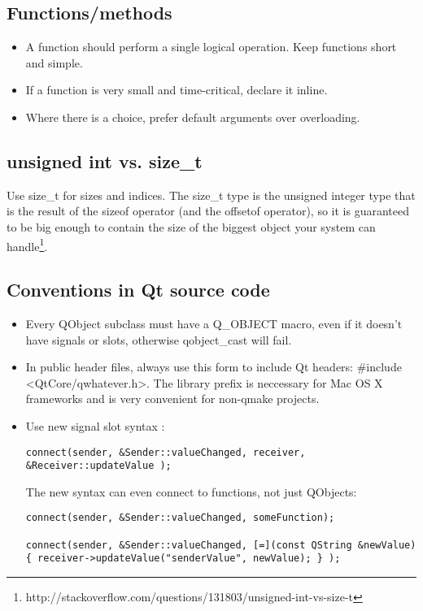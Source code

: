 \documentclass[a4paper,12pt]{article}
\begin{document}
\subsection{Functions/methods}
\begin{itemize}
\item A function should perform a single logical operation. Keep functions short and simple.
\item If a function is very small and time-critical, declare it inline.
\item  Where there is a choice, prefer default arguments over overloading.
\end{itemize}

\subsection{unsigned int vs. size\_t}
Use size\_t for sizes and indices. The size\_t type is the unsigned integer type that is the result of the sizeof operator (and the offsetof operator), so it is guaranteed to be big enough to contain the size of the biggest object your system can handle\footnote{http://stackoverflow.com/questions/131803/unsigned-int-vs-size-t}.


\subsection{Conventions in Qt source code}
\begin{itemize}
\item Every QObject subclass must have a Q\_OBJECT macro, even if it doesn't have signals or slots, otherwise qobject\_cast will fail.
\item In public header files, always use this form to include Qt headers: \#include <QtCore/qwhatever.h>. The library prefix is neccessary for Mac OS X frameworks and is very convenient for non-qmake projects.
\item Use new signal slot syntax : 
\begin{lstlisting}[breaklines]
connect(sender, &Sender::valueChanged, receiver, &Receiver::updateValue );
 \end{lstlisting}
The new syntax can even connect to functions, not just QObjects:
\begin{lstlisting}[breaklines]
connect(sender, &Sender::valueChanged, someFunction);

connect(sender, &Sender::valueChanged, [=](const QString &newValue) { receiver->updateValue("senderValue", newValue); } );
 \end{lstlisting}

\end{itemize}
\end{document}
